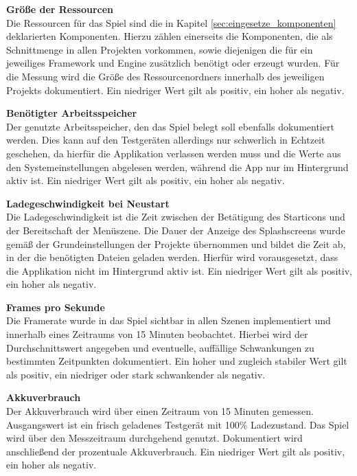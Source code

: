 
\bigskip
\textbf{Größe der Ressourcen} \\
Die Ressourcen für das Spiel sind die in Kapitel \ref{sec:eingesetze_komponenten} deklarierten Komponenten. Hierzu zählen einerseits die Komponenten, die als Schnittmenge in allen Projekten vorkommen, sowie diejenigen die für ein jeweiliges Framework und Engine zusätzlich benötigt oder erzeugt wurden. Für die Messung wird die Größe des Ressourcenordners innerhalb des jeweiligen Projekts dokumentiert. Ein niedriger Wert gilt als positiv, ein hoher als negativ.

\bigskip
\textbf{Benötigter Arbeitsspeicher} \\
Der genutzte Arbeitsspeicher, den das Spiel belegt soll ebenfalls dokumentiert werden. Dies kann auf den Testgeräten allerdings nur schwerlich in Echtzeit geschehen, da hierfür die Applikation verlassen werden muss und die Werte aus den Systemeinstellungen abgelesen werden, während die App nur im Hintergrund aktiv ist. Ein niedriger Wert gilt als positiv, ein hoher als negativ.

\bigskip
\textbf{Ladegeschwindigkeit bei Neustart} \\
Die Ladegeschwindigkeit ist die Zeit zwischen der Betätigung des Starticons und der Bereitschaft der Menüszene. Die Dauer der Anzeige des Splashscreens wurde gemäß der Grundeinstellungen der Projekte übernommen und bildet die Zeit ab, in der die benötigten Dateien geladen werden. Hierfür wird vorausgesetzt, dass die Applikation nicht im Hintergrund aktiv ist. Ein niedriger Wert gilt als positiv, ein hoher als negativ.

\bigskip
\textbf{Frames pro Sekunde} \\
Die Framerate wurde in das Spiel sichtbar in allen Szenen implementiert und innerhalb eines Zeitraums von 15 Minuten beobachtet. Hierbei wird der Durchschnittswert angegeben und eventuelle, auffällige Schwankungen zu bestimmten Zeitpunkten dokumentiert. Ein hoher und zugleich stabiler Wert gilt als positiv, ein niedriger oder stark schwankender als negativ.

\bigskip
\textbf{Akkuverbrauch} \\
Der Akkuverbrauch wird über einen Zeitraum von 15 Minuten gemessen. Ausgangswert ist ein frisch geladenes Testgerät mit 100\% Ladezustand. Das Spiel wird über den Messzeitraum durchgehend genutzt. Dokumentiert wird anschließend der prozentuale Akkuverbrauch. Ein niedriger Wert gilt als positiv, ein hoher als negativ.

